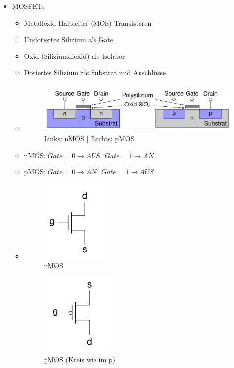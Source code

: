 \documentclass[11pt,a4paper]{article}
\begin{document}
\begin{itemize}
\begin{itemize}
	\item MOSFETs
		\begin{itemize}
		\item Metalloxid-Halbleiter (MOS) Transistoren
		\item Undotiertes Silizium als Gate
		\item Oxid (Siliziumdioxid) als Isolator
		\item Dotiertes Silizium als Substrat und Anschlüsse
		\item[] \begin{figure}[H]
				\begin{center}
				\includegraphics[height=2.5cm]{Bilder/npmos}
				\caption{Links: nMOS | Rechts: pMOS}
				\end{center}
				\end{figure}
		\item nMOS: $Gate = 0 \rightarrow AUS ~~~ Gate = 1 \rightarrow AN$
		\item pMOS: $Gate = 0 \rightarrow AN ~~~ Gate = 1 \rightarrow AUS$
		\item[]
			\begin{minipage}{0.3\textwidth}
				\begin{figure}[H]
				\includegraphics[height=4cm]{Bilder/nmos}
				\caption{nMOS}
				\end{figure}
			\end{minipage}
			\begin{minipage}[t]{0.4\textwidth}
				\begin{figure}[H]
				\vspace{-2.75cm}
				\includegraphics[height=4cm]{Bilder/pmos}
				\caption{pMOS (Kreis wie im p)}
				\end{figure}
			\end{minipage}
		\end{itemize}
	\end{itemize}



\end{itemize}
\end{document}
